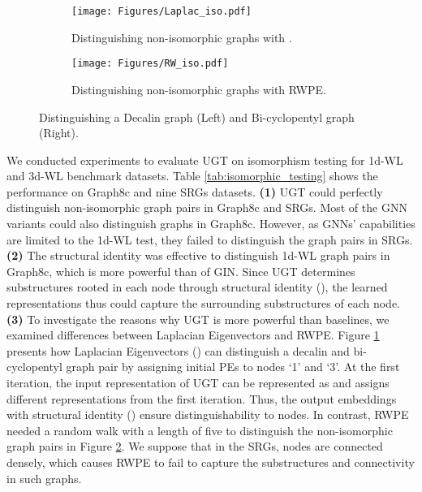\documentclass[oneside]{article}
\begin{document}
\begin{figure}[t]
\centering \begin{subfigure}{0.8\textwidth}
\centering \vspace{-7pt} 
  \texttt{[image: Figures/Laplac\_iso.pdf]}
  \vspace{-7pt} 
  \caption{Distinguishing non-isomorphic graphs with .}
  \label{fig:Lap_RWPE_a}
\end{subfigure}

\begin{subfigure}{0.8\textwidth}
\centering \texttt{[image: Figures/RW\_iso.pdf]}
  \vspace{-14pt}
  \caption{Distinguishing non-isomorphic graphs with RWPE.}
  \label{fig:Lap_RWPE_b}
\end{subfigure}\hfil \caption{Distinguishing a Decalin graph (Left) and Bi-cyclopentyl graph (Right).
}
\label{fig:Lap_RWPE}
\end{figure}





We conducted experiments to evaluate UGT on isomorphism testing for 1d-WL and 3d-WL benchmark datasets.
Table \ref{tab:isomorphic_testing} shows the performance on Graph8c and nine SRGs datasets.
\textbf{(1)} UGT could perfectly distinguish non-isomorphic graph pairs in Graph8c and SRGs.
Most of the GNN variants could also distinguish graphs in Graph8c.
However, as GNNs' capabilities are limited to the 1d-WL test, they failed to distinguish the graph pairs in SRGs.
\textbf{(2)} 
The structural identity was effective to distinguish 1d-WL graph pairs in Graph8c, which is more powerful than  of GIN.
Since UGT determines substructures rooted in each node through structural identity (), the learned representations thus could capture the surrounding substructures of each node.
\textbf{(3)}
To investigate the reasons why UGT is more powerful than baselines, we examined differences between Laplacian Eigenvectors and RWPE.
Figure \ref{fig:Lap_RWPE_a} presents how Laplacian Eigenvectors () can distinguish a decalin and bi-cyclopentyl graph pair by assigning initial PEs to nodes `1' and `3'.
At the first iteration, the input representation of UGT can be represented as  and assigns different representations from the first iteration.
Thus, the output embeddings with structural identity () ensure distinguishability to nodes. 
In contrast, RWPE needed a random walk with a length of five to distinguish the non-isomorphic graph pairs in Figure \ref{fig:Lap_RWPE_b}.
We suppose that in the SRGs, nodes are connected densely, which causes RWPE to fail to capture the substructures and connectivity in such graphs.
\end{document}

